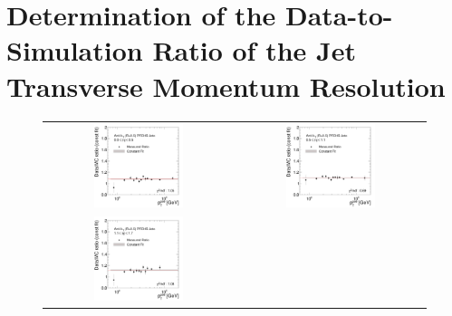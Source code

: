 \section[Determination of the Data-to-Simulation Ratio]{Determination of the Data-to-Simulation Ratio of the Jet Transverse Momentum Resolution}
\label{sec:jer_ratio_determination}
\begin{figure}[!htp]
  \centering
  \begin{tabular}{cc}
                \includegraphics[width=0.49\textwidth]{figures/ExtrapolRatio_Eta0_with_pli_final_nominal_v4.pdf} &
                \includegraphics[width=0.49\textwidth]{figures/ExtrapolRatio_Eta1_with_pli_final_nominal_v4.pdf} \\
                \includegraphics[width=0.49\textwidth]{figures/ExtrapolRatio_Eta2_with_pli_final_nominal_v4.pdf} &

\end{tabular}
\end{figure}
